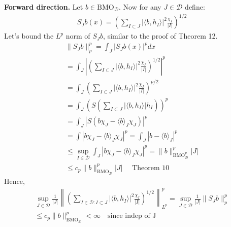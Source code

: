 \documentclass{article}
\newcommand{\D}{\mathcal{D}}
\newcommand{\bmo}{\text{BMO}}
\begin{document}
\textbf{Forward direction. } Let $b \in \bmo_{\D}$. Now for any $J \in \D$ define:
\begin{gather*}
    S_J b(x) = \left( \sum_{I \subset J} |\langle b, h_I \rangle|^2 \frac{\chi_I}{|I|} \right)^{1/2}
\end{gather*}
Let's bound the $L^p$ norm of $S_Jb$, similar to the proof of Theorem 12.
\begin{gather*}
    \lVert S_J b \rVert_p^p = \int_{J} |S_J b(x)|^p dx\\
    = \int_{J} |\left( \sum_{I \subset J} |\langle b, h_I \rangle|^2 \frac{\chi_I}{|I|} \right)^{1/2}|^p\\
    = \int_{J} \left( \sum_{I \subset J} |\langle b, h_I \rangle|^2 \frac{\chi_I}{|I|} \right)^{p/2} \\
    = \int_{J} \left( S\left( \sum_{I \subset J} |\langle b, h_I \rangle| h_I \right) \right)^p \\
    = \int_{J} \left| S\left( b\chi_J - \langle b \rangle_J \chi_J \right) \right|^p\\
    = \int \left|b\chi_J - \langle b \rangle_J \chi_J \right|^p = \int_J \left|b - \langle b \rangle_J \right|^p\\
    \leq \sup_{I \in \D} \int_J \left|b\chi_J - \langle b \rangle_J \chi_J \right|^p = \lVert b \rVert_{\bmo_{\D}^p}^p |J|\\
    \leq c_p \lVert b \rVert_{\bmo_{\D}}^p |J| \quad \text{ Theorem 10}
\end{gather*}
Hence, 
\begin{gather*}
    \sup_{J \in \D} \frac{1}{|J|} \left\lVert \left( \sum_{I \in \D: I \subset J} |\langle b, h_I \rangle|^2 \frac{\chi_I}{|I|} \right)^{1/2} \right\rVert_{L^p}^p = \sup_{J \in \D} \frac{1}{|J|} \lVert S_Jb \rVert_p^p\\
    \leq c_p \lVert b \rVert_{\bmo_{\D}}^p < \infty \quad \text{since indep of J}
\end{gather*}
\\~
\end{document}
